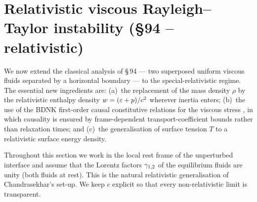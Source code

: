 %
%
%

\section{Relativistic viscous Rayleigh--Taylor instability (\S94 -- relativistic)}
\label{sec:rel-10-94}

We now extend the classical analysis of \S\,94 --- two superposed
uniform viscous fluids separated by a horizontal boundary --- to the
special-relativistic regime.  The essential new ingredients are:
(a)~the replacement of the mass density $\rho$ by the relativistic
enthalpy density $w = (\varepsilon + p)/c^{2}$ wherever
inertia enters; (b)~the use of the BDNK first-order causal constitutive
relations for the viscous stress \citep{BemficaDN2018,Kovtun2019},
in which causality is ensured by frame-dependent transport-coefficient
bounds rather than relaxation times; and (c)~the generalisation of surface tension $T$
to a relativistic surface energy density.

Throughout this section we work in the local rest frame of the
unperturbed interface and assume that the Lorentz factors $\gamma_{1,2}$
of the equilibrium fluids are unity (both fluids at rest).  This is
the natural relativistic generalisation of Chandrasekhar's set-up.
We keep $c$ explicit so that every non-relativistic limit is
transparent.

